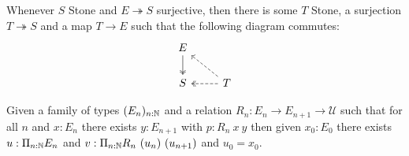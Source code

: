 \begin{axiomNum}
  Whenever $S$ Stone and $E\twoheadrightarrow S$ surjective, then there is some $T$ Stone,
    a surjection $T \twoheadrightarrow S$ and a map $T\to E$ 
    such that the following diagram commutes:
    \begin{equation}\begin{tikzcd}
      E \arrow[d,""',two heads]\\
      S & \arrow[l, "", two heads, dashed] T\arrow[lu, ""',dashed ]
    \end{tikzcd}\end{equation}  
\end{axiomNum} 


\begin{axiomNum}\label{axDependentChoice}
  Given a family of types $(E_n)_{n:\mathbb{N}}$ and 
  a relation 
  $R_n:E_n\rightarrow E_{n+1}\rightarrow {\mathcal U}$ such that
  for all $n$ and $x:E_n$ there exists $y:E_{n+1}$ with $p:R_n~x~y$ 
  then given $x_0:E_0$ there exists
  $u:\Pi_{n:\mathbb{N}}E_n$ and $v:\Pi_{n:\mathbb{N}}R_n~(u_n)~(u_{n+1})$ and $u_0 = x_0$.
\end{axiomNum}
